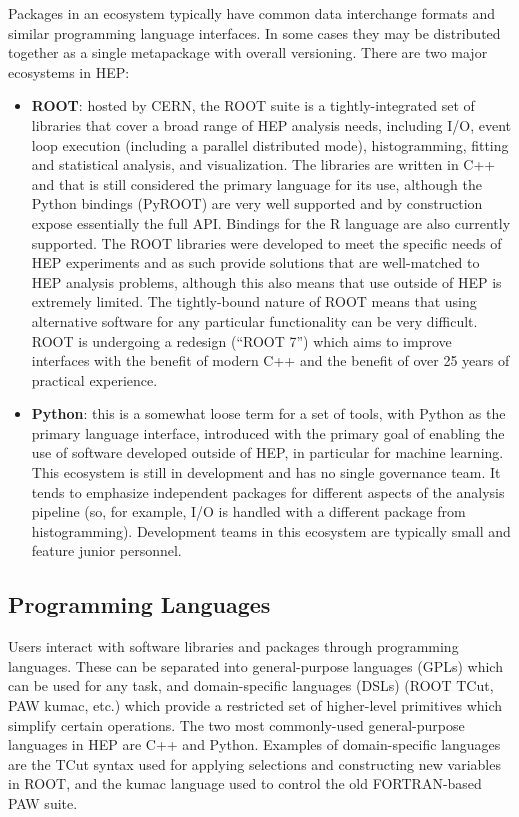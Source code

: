 Packages in an ecosystem typically have common data interchange formats and similar programming language interfaces. In some cases they may be distributed together as a single metapackage with overall versioning. There are two major ecosystems in HEP:
\begin{itemize}
    \item \textbf{ROOT}: hosted by CERN, the ROOT suite is a tightly-integrated set of libraries that cover a broad range of HEP analysis needs, including I/O, event loop execution (including a parallel distributed mode), histogramming, fitting and statistical analysis, and visualization. The libraries are written in C++ and that is still considered the primary language for its use, although the Python bindings (PyROOT) are very well supported and by construction expose essentially the full API.  Bindings for the R language are also currently supported. The ROOT libraries were developed to meet the specific needs of HEP experiments and as such provide solutions that are well-matched to HEP analysis problems, although this also means that use outside of HEP is extremely limited. The tightly-bound nature of ROOT means that using alternative software for any particular functionality can be very difficult. ROOT is undergoing a redesign (``ROOT 7'') which aims to improve interfaces with the benefit of modern C++ and the benefit of over 25 years of practical experience.
    \item \textbf{Python}: this is a somewhat loose term for a set of tools, with Python as the primary language interface, introduced with the primary goal of enabling the use of software developed outside of HEP, in particular for machine learning. This ecosystem is still in development and has no single governance team. It tends to emphasize independent packages for different aspects of the analysis pipeline (so, for example, I/O is handled with a different package from histogramming). Development teams in this ecosystem are typically small and feature junior personnel. 
\end{itemize}

\subsection{Programming Languages}
Users interact with software libraries and packages through programming languages. These can be separated into general-purpose languages (GPLs) which can be used for any task, and domain-specific languages (DSLs) (ROOT TCut, PAW kumac, etc.) which provide a restricted set of higher-level primitives which simplify certain operations. The two most commonly-used general-purpose languages in HEP are C++ and Python. Examples of domain-specific languages are the TCut syntax used for applying selections and constructing new variables in ROOT, and the kumac language used to control the old FORTRAN-based PAW suite.


